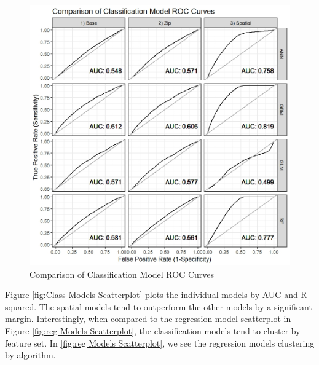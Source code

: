 \documentclass[conference,final,]{IEEEtran}
\makeatletter
\def\maxwidth{\ifdim\Gin@nat@width>\linewidth\linewidth
\else\Gin@nat@width\fi}
\let\Oldincludegraphics\includegraphics
\renewcommand{\includegraphics}[1]{\Oldincludegraphics[width=\maxwidth]{#1}}
\makeatother
\begin{document}
\begin{figure}
\centering
\includegraphics{Sections/tables_and_figures/compare_model_roc_curves.jpeg}
\caption{\label{fig:AUC Comparrison}Comparison of Classification Model
ROC Curves}
\end{figure}

\noindent Figure \ref{fig:Class Models Scatterplot} plots the individual
models by AUC and R-squared. The spatial models tend to outperform the
other models by a significant margin. Interestingly, when compared to
the regression model scatterplot in Figure
\ref{fig:reg Models Scatterplot}, the classification models tend to
cluster by feature set. In \ref{fig:reg Models Scatterplot}, we see the
regression models clustering by algorithm.
\end{document}
